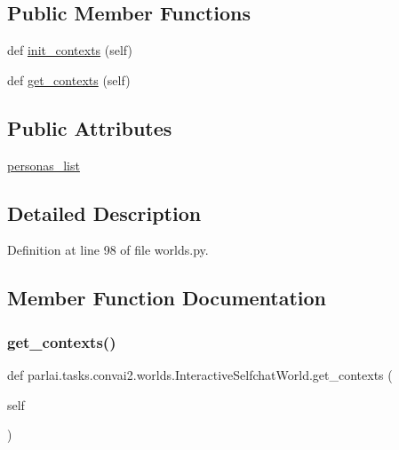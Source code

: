 \subsection*{Public Member Functions}
\begin{DoxyCompactItemize}
\item 
def \hyperlink{classparlai_1_1tasks_1_1convai2_1_1worlds_1_1InteractiveSelfchatWorld_af7524303845371d515ac5ee27a650ce8}{init\+\_\+contexts} (self)
\item 
def \hyperlink{classparlai_1_1tasks_1_1convai2_1_1worlds_1_1InteractiveSelfchatWorld_a3bf4578410c84b762c08cd9e1a8b4549}{get\+\_\+contexts} (self)
\end{DoxyCompactItemize}
\subsection*{Public Attributes}
\begin{DoxyCompactItemize}
\item 
\hyperlink{classparlai_1_1tasks_1_1convai2_1_1worlds_1_1InteractiveSelfchatWorld_aa750cd45fa90b0d961c23e8d25ac5b4a}{personas\+\_\+list}
\end{DoxyCompactItemize}


\subsection{Detailed Description}


Definition at line 98 of file worlds.\+py.



\subsection{Member Function Documentation}
\mbox{\label{classparlai_1_1tasks_1_1convai2_1_1worlds_1_1InteractiveSelfchatWorld_a3bf4578410c84b762c08cd9e1a8b4549}} 
\subsubsection{\texorpdfstring{get\+\_\+contexts()}{get\_contexts()}}
{\footnotesize\ttfamily def parlai.\+tasks.\+convai2.\+worlds.\+Interactive\+Selfchat\+World.\+get\+\_\+contexts (\begin{DoxyParamCaption}\item[{}]{self }\end{DoxyParamCaption})}



